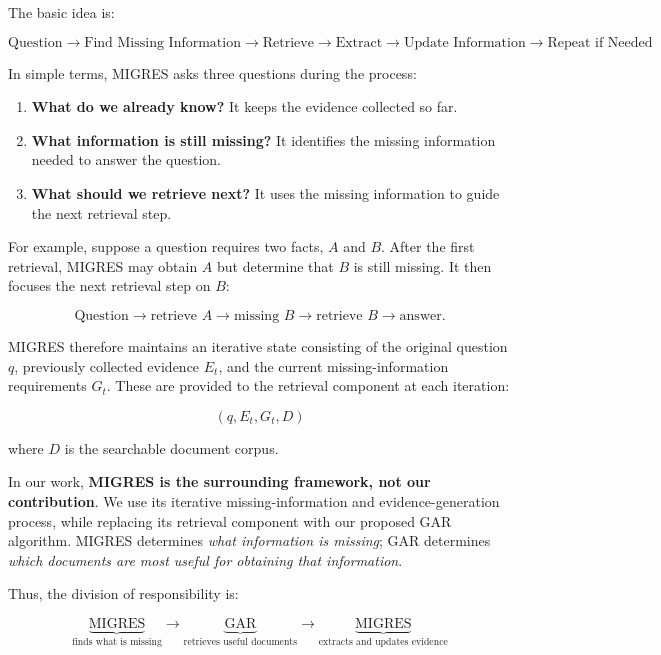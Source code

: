 \documentclass[11pt,a4paper]{article}
\begin{document}
The basic idea is:

\[
\boxed{
\text{Question}
\rightarrow
\text{Find Missing Information}
\rightarrow
\text{Retrieve}
\rightarrow
\text{Extract}
\rightarrow
\text{Update Information}
\rightarrow
\text{Repeat if Needed}
}
\]

In simple terms, MIGRES asks three questions during the process:

\begin{enumerate}[leftmargin=1.5em]
    \item \textbf{What do we already know?}
    It keeps the evidence collected so far.

    \item \textbf{What information is still missing?}
    It identifies the missing information needed to answer the question.

    \item \textbf{What should we retrieve next?}
    It uses the missing information to guide the next retrieval step.
\end{enumerate}

For example, suppose a question requires two facts, $A$ and $B$. After the first retrieval, MIGRES may obtain $A$ but determine that $B$ is still missing. It then focuses the next retrieval step on $B$:

\[
\text{Question}
\rightarrow
\text{retrieve }A
\rightarrow
\text{missing }B
\rightarrow
\text{retrieve }B
\rightarrow
\text{answer}.
\]

MIGRES therefore maintains an iterative state consisting of the original question $q$, previously collected evidence $E_t$, and the current missing-information requirements $G_t$. These are provided to the retrieval component at each iteration:

\[
\boxed{
(q,E_t,G_t,D)
}
\]

where $D$ is the searchable document corpus.

In our work, \textbf{MIGRES is the surrounding framework, not our contribution}. We use its iterative missing-information and evidence-generation process, while replacing its retrieval component with our proposed GAR algorithm. MIGRES determines \emph{what information is missing}; GAR determines \emph{which documents are most useful for obtaining that information}.

Thus, the division of responsibility is:

\[
\boxed{
\underbrace{\text{MIGRES}}_{\text{finds what is missing}}
\rightarrow
\underbrace{\text{GAR}}_{\text{retrieves useful documents}}
\rightarrow
\underbrace{\text{MIGRES}}_{\text{extracts and updates evidence}}
}
\]
\end{document}
